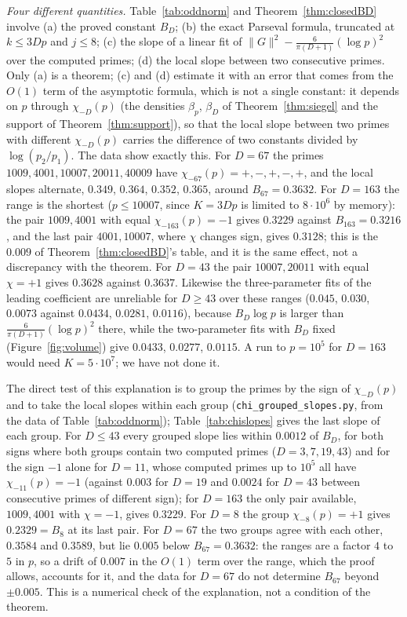 \documentclass[11pt]{amsart}
\theoremstyle{remark}
\begin{document}
\emph{Four different quantities.} Table~\ref{tab:oddnorm} and Theorem~\ref{thm:closedBD} involve (a) the proved constant $B_D$; (b) the exact Parseval formula, truncated at $k\le3Dp$ and $j\le8$; (c) the slope of a linear fit of $\|G\|^2-\frac6{\pi(D+1)}(\log p)^2$ over the computed primes; (d) the local slope between two consecutive primes. Only (a) is a theorem; (c) and (d) estimate it with an error that comes from the $O(1)$ term of the asymptotic formula, which is not a single constant: it depends on $p$ through $\chi_{-D}(p)$ (the densities $\beta_p$, $\beta_D$ of Theorem~\ref{thm:siegel} and the support of Theorem~\ref{thm:support}), so that the local slope between two primes with different $\chi_{-D}(p)$ carries the difference of two constants divided by $\log(p_2/p_1)$. The data show exactly this. For $D=67$ the primes $1009,4001,10007,20011,40009$ have $\chi_{-67}(p)=+,-,+,-,+$, and the local slopes alternate, $0.349$, $0.364$, $0.352$, $0.365$, around $B_{67}=0.3632$. For $D=163$ the range is the shortest ($p\le10007$, since $K=3Dp$ is limited to $8\cdot10^6$ by memory): the pair $1009,4001$ with equal $\chi_{-163}(p)=-1$ gives $0.3229$ against $B_{163}=0.3216$, and the last pair $4001,10007$, where $\chi$ changes sign, gives $0.3128$; this is the $0.009$ of Theorem~\ref{thm:closedBD}'s table, and it is the same effect, not a discrepancy with the theorem. For $D=43$ the pair $10007,20011$ with equal $\chi=+1$ gives $0.3628$ against $0.3637$. Likewise the three-parameter fits of the leading coefficient are unreliable for $D\ge43$ over these ranges ($0.045$, $0.030$, $0.0073$ against $0.0434$, $0.0281$, $0.0116$), because $B_D\log p$ is larger than $\frac6{\pi(D+1)}(\log p)^2$ there, while the two-parameter fits with $B_D$ fixed (Figure~\ref{fig:volume}) give $0.0433$, $0.0277$, $0.0115$. A run to $p=10^5$ for $D=163$ would need $K=5\cdot10^7$; we have not done it.

The direct test of this explanation is to group the primes by the sign of $\chi_{-D}(p)$ and to take the local slopes within each group (\texttt{chi\_grouped\_slopes.py}, from the data of Table~\ref{tab:oddnorm}); Table~\ref{tab:chislopes} gives the last slope of each group. For $D\le43$ every grouped slope lies within $0.0012$ of $B_D$, for both signs where both groups contain two computed primes ($D=3,7,19,43$) and for the sign $-1$ alone for $D=11$, whose computed primes up to $10^5$ all have $\chi_{-11}(p)=-1$ (against $0.003$ for $D=19$ and $0.0024$ for $D=43$ between consecutive primes of different sign); for $D=163$ the only pair available, $1009,4001$ with $\chi=-1$, gives $0.3229$. For $D=8$ the group $\chi_{-8}(p)=+1$ gives $0.2329=B_8$ at its last pair. For $D=67$ the two groups agree with each other, $0.3584$ and $0.3589$, but lie $0.005$ below $B_{67}=0.3632$: the ranges are a factor $4$ to $5$ in $p$, so a drift of $0.007$ in the $O(1)$ term over the range, which the proof allows, accounts for it, and the data for $D=67$ do not determine $B_{67}$ beyond $\pm0.005$. This is a numerical check of the explanation, not a condition of the theorem.
\end{document}
